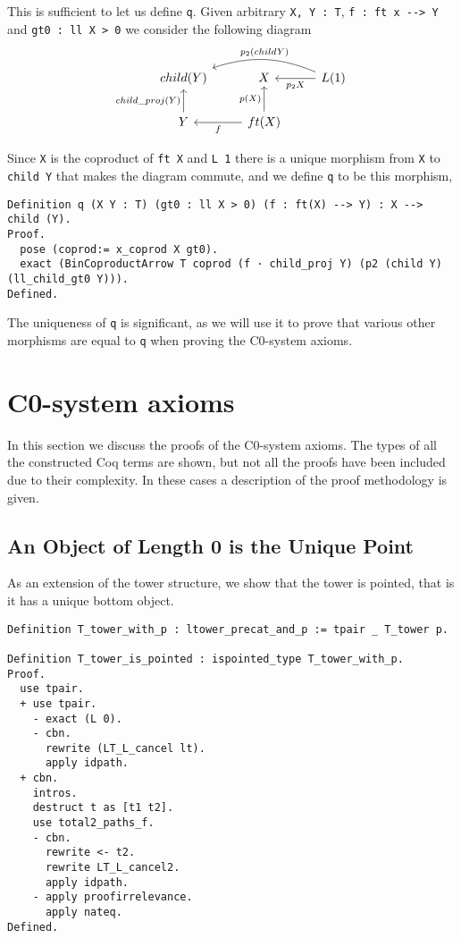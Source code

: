 This is sufficient to let us define \lstinline|q|. Given arbitrary \lstinline|X, Y : T|,
\lstinline|f : ft x --> Y| and \lstinline|gt0 : ll X > 0| we consider the following
diagram
\[
\begin{tikzcd}
    child(Y) &
    X & 
    L(1)
    \ar[l, "p_2 X"]
    \ar[ll, bend right=20, "p_2 (child Y)"'] \\
    Y
    \ar[u, "child\_proj(Y)"] &
    ft(X)
    \ar[u, "p(X)"]
    \ar[l, "f"] &
\end{tikzcd}
\]

Since \lstinline|X| is the coproduct of \lstinline|ft X| and \lstinline|L 1| there is a unique
morphism from \lstinline|X| to \lstinline|child Y| that makes the diagram commute, and we
define \lstinline|q| to be this morphism,
\begin{lstlisting}
Definition q (X Y : T) (gt0 : ll X > 0) (f : ft(X) --> Y) : X --> child (Y).
Proof.
  pose (coprod:= x_coprod X gt0).
  exact (BinCoproductArrow T coprod (f · child_proj Y) (p2 (child Y) (ll_child_gt0 Y))).
Defined.
\end{lstlisting}

The uniqueness of \lstinline|q| is significant, as we will use it to prove that
various other morphisms are equal to \lstinline|q| when proving the C0-system axioms.

\section{C0-system axioms}
In this section we discuss the proofs of the C0-system axioms. The types of all
the constructed Coq terms are shown, but not all the proofs have been included
due to their complexity. In these cases a description of the proof methodology
is given.

\subsection{An Object of Length 0 is the Unique Point}
As an extension of the tower structure, we show that the tower is pointed, that
is it has a unique bottom object. 

\begin{lstlisting}
Definition T_tower_with_p : ltower_precat_and_p := tpair _ T_tower p.

Definition T_tower_is_pointed : ispointed_type T_tower_with_p.
Proof.
  use tpair.
  + use tpair.
    - exact (L 0).
    - cbn.
      rewrite (LT_L_cancel lt).
      apply idpath.
  + cbn.
    intros.
    destruct t as [t1 t2].
    use total2_paths_f.
    - cbn.
      rewrite <- t2.
      rewrite LT_L_cancel2.
      apply idpath.
    - apply proofirrelevance.
      apply nateq.
Defined.
\end{lstlisting}

